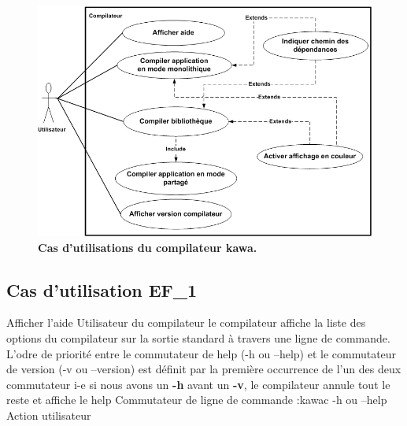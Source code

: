 \begin{figure}
  \centering
  \includegraphics[scale=0.8]{../res/stb/vs_finale_usecase.jpg}
  \caption{\textbf{Cas d'utilisations du compilateur kawa.}}
\end{figure}

\subsection{Cas d'utilisation EF\_1}
\fiche
{Afficher l'aide}                    %
{Utilisateur du compilateur}                               %
{                                                %
  le compilateur affiche 
   la liste des options du compilateur sur la sortie standard à travers une ligne de commande.
}
{
  L'odre de priorité entre le commutateur de help (-h ou --help) et le commutateur de version (-v ou --version) est définit par la première occurrence de l'un des deux commutateur i-e si nous avons un \textbf {-h} avant un \textbf {-v}, le compilateur annule tout le reste et affiche le help 
}                                                %
{Commutateur de ligne de commande :kawac -h ou --help}                             %
{Action utilisateur}                       %
{} %
{} %
{} %


